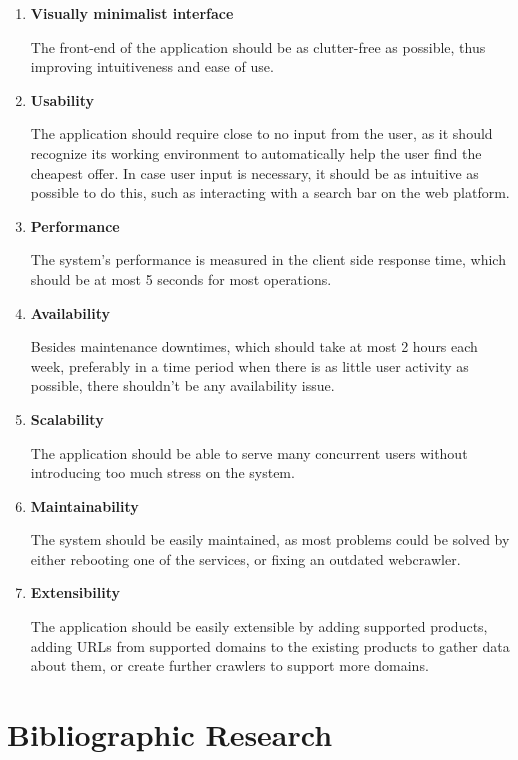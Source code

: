 \documentclass[12pt,a4paper,twoside]{report}
\begin{document}
\begin{enumerate}
  \item \textbf{Visually minimalist interface}

        The front-end of the application should be as clutter-free as possible, thus improving intuitiveness and ease of use.

  \item \textbf{Usability}

        The application should require close to no input from the user, as it should recognize its working environment to automatically help the user find the cheapest offer. In case user input is necessary, it should be as intuitive as possible to do this, such as interacting with a search bar on the web platform.

  \item \textbf{Performance}

        The system’s performance is measured in the client side response time, which should be at most 5 seconds for most operations.

  \item \textbf{Availability}

        Besides maintenance downtimes, which should take at most 2 hours each week, preferably in a time period when there is as little user activity as possible, there shouldn’t be any availability issue.

  \item \textbf{Scalability}

        The application should be able to serve many concurrent users without introducing too much stress on the system.

  \item \textbf{Maintainability}

        The system should be easily maintained, as most problems could be solved by either rebooting one of the services, or fixing an outdated webcrawler.

  \item \textbf{Extensibility}

        The application should be easily extensible by adding supported products, adding URLs from supported domains to the existing products to gather data about them, or create further crawlers to support more domains.

\end{enumerate}


\chapter{Bibliographic Research}
\end{document}

